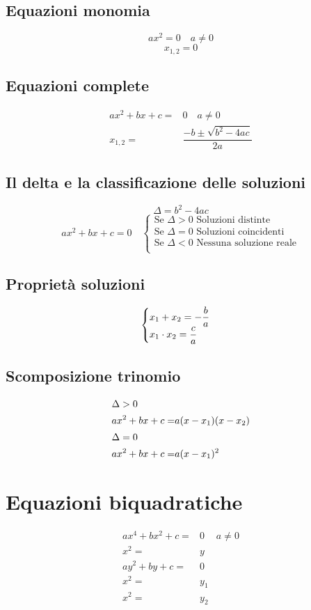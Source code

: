 \section{Equazioni monomia}
\begin{equation}
ax^2=0\quad a\neq 0
\end{equation}
\begin{equation}
x_{1,2}=0
\end{equation}
\section{Equazioni complete}
\begin{align}
ax^2+bx+c=&0\quad a\neq 0\\
x_{1,2}=&\dfrac{-b\pm\sqrt{b^2-4ac}}{2a}
\end{align}
\section{Il delta e la classificazione delle soluzioni}
\begin{equation}
\Delta=b^2-4ac
\end{equation}
\begin{equation}
ax^2+bx+c=0\quad\begin{cases}
\text{Se $\Delta >0$ Soluzioni distinte}\\
\text{Se $\Delta =0$ Soluzioni coincidenti}\\
\text{Se $\Delta <0$ Nessuna soluzione reale}\\
\end{cases}
\end{equation}
\section{Proprietà soluzioni}
\begin{equation}
\begin{cases}
x_1+x_2=-\dfrac{b}{a}\\
x_1\cdot x_2=\dfrac{c}{a}
\end{cases}\index{Equazione!secondo grado!somma soluzioni}\index{Equazione!secondo grado!prodotto soluzioni}
\end{equation}
\section{Scomposizione trinomio}
\begin{align}
\intertext{$\Delta>0$}
ax^2+bx+c=&a(x-x_1)(x-x_2)\\
\intertext{$\Delta=0$}
ax^2+bx+c=&a(x-x_1)^2
\end{align}
\chapter{Equazioni biquadratiche}
\begin{align}
ax^4+bx^2+c=&0&a\neq 0\\
x^2=&y\\
ay^2+by+c=&0\\
x^2=&y_1\\
x^2=&y_2
\end{align}
